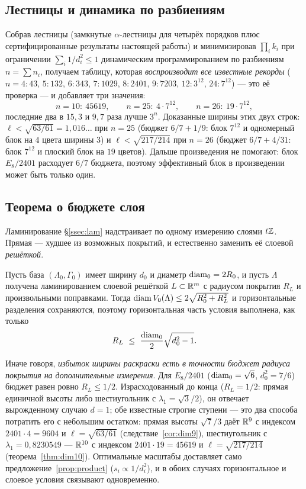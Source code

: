 \subsection{Лестницы и динамика по разбиениям}

Собрав лестницы (замкнутые $\alpha$-лестницы для четырёх порядков плюс
сертифицированные результаты настоящей работы) и минимизировав $\prod_i k_i$ при
ограничении $\sum_i 1/d_i^2\le1$ динамическим программированием по разбиениям
$n=\sum n_i$, получаем таблицу, которая \emph{воспроизводит все известные
рекорды} ($n=4{:}43$, $5{:}132$, $6{:}343$, $7{:}1029$, $8{:}2401$, $9{:}7203$,
$12{:}3^{12}$, $24{:}7^{12}$) --- это её проверка --- и добавляет три значения:
\[
n=10{:}\ 45619,\qquad
n=25{:}\ 4\cdot7^{12},\qquad
n=26{:}\ 19\cdot7^{12},
\]
последние два в $15{,}3$ и $9{,}7$ раза лучше $3^n$. Доказанные ширины этих
двух строк: $\ell<\sqrt{63/61}=1{,}016\ldots$ при $n=25$ (бюджет $6/7+1/9$:
блок $7^{12}$ и одномерный блок на $4$ цвета ширины $3$) и
$\ell<\sqrt{217/214}$ при $n=26$ (бюджет $6/7+4/31$: блок $7^{12}$ и плоский
блок на $19$ цветов). Дальше произведения не
помогают: блок $E_8/2401$ расходует $6/7$ бюджета, поэтому эффективный блок в
произведении может быть только один.

\subsection{Теорема о бюджете слоя}
\label{ssec:layerbudget}

Ламинирование \S\ref{ssec:lam} надстраивает по одному измерению слоями $t\mathbb{Z}$.
Прямая --- худшее из возможных покрытий, и естественно заменить её слоевой
\emph{решёткой}.

\begin{proposition}\label{prop:layerbudget}
Пусть база $(\Lambda_0,\Gamma_0)$ имеет ширину $d_0$ и диаметр $\operatorname{diam}_0=2R_0$, и
пусть $\Lambda$ получена ламинированием слоевой решёткой $L\subset\mathbb{R}^m$ с
радиусом покрытия $R_L$ и произвольными поправками. Тогда
$\operatorname{diam} V_0(\Lambda)\le2\sqrt{R_0^2+R_L^2}$ и горизонтальные разделения
сохраняются, поэтому горизонтальная часть условия выполнена, как только
\[
R_L\ \le\ \frac{\diam_0}{2}\sqrt{d_0^2-1}.
\]
\end{proposition}

Иначе говоря, \emph{избыток ширины раскраски есть в точности бюджет радиуса
покрытия на дополнительные измерения}. Для $E_8/2401$ ($\operatorname{diam}_0=\sqrt6$,
$d_0^2=7/6$) бюджет равен ровно $R_L\le1/2$. Израсходованный до конца
($R_L=1/2$: прямая единичной высоты либо шестиугольник с
$\lambda_1=\sqrt3/2$), он отвечает вырожденному случаю $d=1$; обе известные
строгие ступени --- это два способа потратить его с небольшим остатком:
прямая высоты $\sqrt7/3$ даёт $\mathbb{R}^9$ с индексом $2401\cdot4=9604$ и
$\ell=\sqrt{63/61}$ (следствие~\ref{cor:dim9}), шестиугольник с
$\lambda_1=0{,}8230549$ --- $\mathbb{R}^{10}$ с индексом $2401\cdot19=45619$ и
$\ell=\sqrt{217/214}$ (теорема~\ref{thm:dim10}). Оптимальные масштабы
доставляет само предложение~\ref{prop:product} ($s_i\propto1/d_i^2$), и в
обоих случаях горизонтальное и слоевое условия связывают одновременно.

